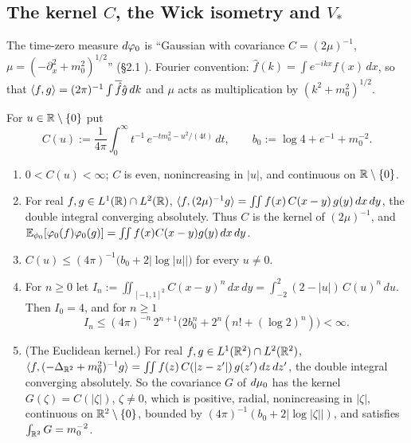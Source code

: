 \subsection{The kernel $C$, the Wick isometry and $V_*$}\label{sec:notation-wick}

The time-zero measure $d\varphi_0$ is ``Gaussian with covariance $C=(2\mu)^{-1}$,
$\mu=(-\partial_x^2+m_0^2)^{1/2}$'' (\S2.1 \cite[p.~6]{R}).  Fourier convention:
$\hat f(k)=\int e^{-ikx}f(x)\,dx$, so that $\langle f,g\rangle=(2\pi)^{-1}\int\overline{\hat f}\hat g\,dk$
and $\mu$ acts as multiplication by $(k^2+m_0^2)^{1/2}$.

\begin{auxlemma}\label{aux:notation-kernel}
For $u\in\mathbb{R}\setminus\{0\}$ put
\[
 C(u):=\frac1{4\pi}\int_0^\infty t^{-1}\,e^{-tm_0^2-u^2/(4t)}\,dt ,\qquad
 b_0:=\log4+e^{-1}+m_0^{-2} .
\]
\begin{enumerate}
\item[\textup{(i)}] $0<C(u)<\infty$; $C$ is even, nonincreasing in $|u|$, and continuous on
$\mathbb{R}\setminus\{0\}$.
\item[\textup{(ii)}] For real $f,g\in L^1(\mathbb{R})\cap L^2(\mathbb{R})$, $\langle f,(2\mu)^{-1}g\rangle=\iint
f(x)\,C(x-y)\,g(y)\,dx\,dy$, the double integral converging absolutely.  Thus $C$ is the
kernel of $(2\mu)^{-1}$, and $\mathbb{E}_{\phi_0}[\varphi_0(f)\varphi_0(g)]=\iint f(x)C(x-y)g(y)\,dx\,dy$.
\item[\textup{(iii)}] $C(u)\le(4\pi)^{-1}\bigl(b_0+2|\log|u||\bigr)$ for every $u\ne0$.
\item[\textup{(iv)}] For $n\ge0$ let $I_n:=\iint_{[-1,1]^2}C(x-y)^n\,dx\,dy=\int_{-2}^2(2-|u|)\,
C(u)^n\,du$.  Then $I_0=4$, and for $n\ge1$
\[
 I_n\le(4\pi)^{-n}\,2^{n+1}\bigl(2b_0^n+2^n(n!+(\log2)^n)\bigr)<\infty .
\]
\item[\textup{(v)}] \textup{(The Euclidean kernel.)}  For real $f,g\in L^1(\mathbb{R}^2)\cap L^2(\mathbb{R}^2)$,
$\langle f,(-\Delta_{\mathbb{R}^2}+m_0^2)^{-1}g\rangle=\iint f(z)\,C(|z-z'|)\,g(z')\,dz\,dz'$, the double integral
converging absolutely.  So the covariance $G$ of $d\mu_0$ has the kernel $G(\zeta)=C(|\zeta|)$,
$\zeta\ne0$, which is positive, radial, nonincreasing in $|\zeta|$, continuous on
$\mathbb{R}^2\setminus\{0\}$, bounded by $(4\pi)^{-1}(b_0+2|\log|\zeta||)$, and satisfies
$\int_{\mathbb{R}^2}G=m_0^{-2}$.
\end{enumerate}
\end{auxlemma}

